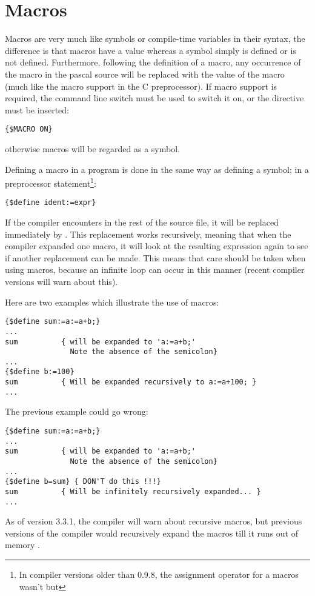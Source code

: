 \section{Macros}
\label{se:Macros}
Macros are very much like symbols or compile-time variables in their syntax, 
the difference is that macros have a value whereas a symbol simply is defined 
or is not defined. Furthermore, following the definition of a macro, any
occurrence of the macro in the pascal source will be replaced with the value
of the macro (much like the macro support in the C preprocessor). If macro 
support is required, the  command line switch must be used to
switch it on, or the directive must be inserted:
\begin{verbatim}
{$MACRO ON}
\end{verbatim}
otherwise macros will be regarded as a symbol.

Defining a macro in a program is done in the same way as defining a symbol;
in a  preprocessor statement\footnote{In compiler
versions older than 0.9.8, the assignment operator for a macros wasn't
\var{:=} but \var{=}}:
\begin{verbatim}
{$define ident:=expr}
\end{verbatim}
If the compiler encounters  in the rest of the source file, it
will be replaced immediately by . This replacement works
recursively, meaning that when the compiler expanded one macro, it
will look at the resulting expression again to see if another replacement
can be made. This means that care should be taken when using macros, 
because an infinite loop can occur in this manner (recent compiler 
versions will warn about this).

Here are two examples which illustrate the use of macros:
\begin{verbatim}
{$define sum:=a:=a+b;}
...
sum          { will be expanded to 'a:=a+b;'
               Note the absence of the semicolon}
...
{$define b:=100}
sum          { Will be expanded recursively to a:=a+100; }
...
\end{verbatim}
The previous example could go wrong:
\begin{verbatim}
{$define sum:=a:=a+b;}
...
sum          { will be expanded to 'a:=a+b;'
               Note the absence of the semicolon}
...
{$define b=sum} { DON'T do this !!!}
sum          { Will be infinitely recursively expanded... }
...
\end{verbatim}
As of version 3.3.1, the compiler will warn about recursive macros, but
previous versions of the compiler would recursively expand the macros till
it runs out of memory .

